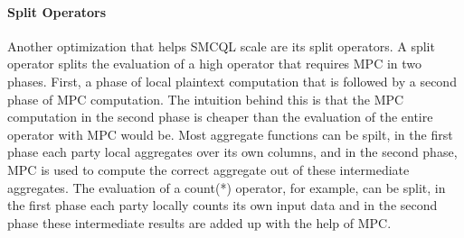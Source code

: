 \paragraph{Split Operators}
Another optimization that helps SMCQL scale are its split operators. A split operator splits the evaluation of a high operator that requires MPC in two phases. First, a phase of local plaintext computation that is followed by a second phase of MPC computation. The intuition behind this is that the MPC computation in the second phase is cheaper than the evaluation of the entire operator with MPC would be. Most aggregate functions can be spilt, in the first phase each party local aggregates over its own columns, and in the second phase, MPC is used to compute the correct aggregate out of these intermediate aggregates. The evaluation of a count(*) operator, for example, can be split, in the first phase each party locally counts its own input data and in the second phase these intermediate results are added up with the help of MPC. %



